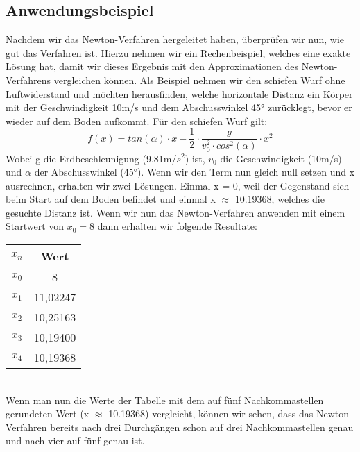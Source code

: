 \documentclass[a4paper,12pt]{report}
\begin{document}
\subsection{Anwendungsbeispiel}
Nachdem wir das Newton-Verfahren hergeleitet haben, überprüfen wir nun, wie gut das Verfahren ist. Hierzu nehmen wir ein Rechenbeispiel, welches eine exakte Lösung hat, damit wir dieses Ergebnis mit den Approximationen des Newton-Verfahrens vergleichen können. Als Beispiel nehmen wir den schiefen Wurf ohne Luftwiderstand und möchten herausfinden, welche horizontale Distanz ein Körper mit der Geschwindigkeit 10m/s und dem Abschusswinkel 45° zurücklegt, bevor er wieder auf dem Boden aufkommt.
Für den schiefen Wurf gilt:
\begin{equation*}
f(x) = tan(\alpha) \cdot x - \frac{1}{2} \cdot \frac{g}{v_{0}^{2} \cdot cos^2(\alpha)} \cdot x^2
\end{equation*}
Wobei g die Erdbeschleunigung (9.81m/$s^2$) ist, $v_0$ die Geschwindigkeit (10m/s) und $\alpha$ der Abschusswinkel (45°). Wenn wir den Term nun gleich null setzen und x ausrechnen, erhalten wir zwei Lösungen. Einmal x = 0, weil der Gegenstand sich beim Start auf dem Boden befindet und einmal x $\approx $ 10.19368, welches die gesuchte Distanz ist.
Wenn wir nun das Newton-Verfahren anwenden mit einem Startwert von $x_0 = 8$ dann erhalten wir folgende Resultate:\\


\begin{center}
\begin{tabular}[h]{c|c}

$x_n$ & Wert \\
\hline
$x_0$ & 8 \\
\hline 
$x_1$ & 11,02247 \\
\hline
$x_2$ & 10,25163 \\
\hline
$x_3$ & 10,19400 \\
\hline
$x_4$ & 10,19368\\

\end{tabular}
\end{center}


\noindent
\\Wenn man nun die Werte der Tabelle mit dem auf fünf Nachkommastellen gerundeten Wert (x $\approx $ 10.19368) vergleicht, können wir sehen, dass das Newton-Verfahren bereits nach drei Durchgängen schon auf drei Nachkommastellen genau und nach vier auf fünf genau ist. \\
\end{document}
